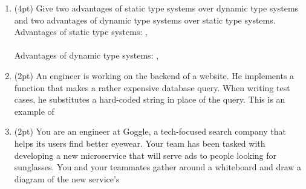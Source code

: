 \documentclass{report}
\newif\ifkey
\newcommand{\correct}[1]{\ifkey\color{red}\textbf{#1}\color{black}\else\textbf{#1}\fi\xspace}
\newcommand{\answershort}[1]{\ifkey\color{red}\underline{\textbf{#1}}\color{black}\else\underline{\hspace{3in}}\fi\xspace}
\newcommand*{\pts}[1]{\addtocounter{points}{#1}(#1pt)}
\begin{document}
\begin{spacing}{1.4}
\begin{enumerate}[leftmargin=*]
\item \pts{4} Give two advantages of static type systems over dynamic type systems and two advantages of dynamic type systems over
  static type systems. \\
  Advantages of static type systems: \answershort{early detection of errors},\\ \answershort{types are documentation} \\
  Advantages of dynamic type systems: \answershort{faster prototyping},\\ \answershort{no false positives}

  \item \pts{2} An engineer is working on the backend of a website. He implements a function that makes a rather expensive
    database query. When writing test cases, he substitutes a hard-coded string in place of the query. This is an example of
     \answershort{mocking}


\newpage
   \item \pts{2} You are an engineer at Goggle, a tech-focused search company that helps its users find better eyewear. Your team
     has been tasked with developing a new microservice that will serve ads to people looking for sunglasses. You and your teammates
     gather around a whiteboard and draw a diagram of the new service's \answershort{architecture}


\end{enumerate}
\end{spacing}
\end{document}
